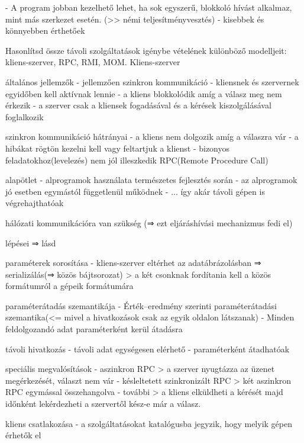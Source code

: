 \documentclass[12pt]{article}
\begin{document}
\begin{description}
        - A program jobban kezelhető lehet, ha sok egyszerű, blokkoló hívást alkalmaz, mint más szerkezet esetén. (>> némi teljesítményvesztés)
        - kisebbek és könnyebben érthetőek 
    \item  Hasonlítsd össze távoli szolgáltatások igénybe vételének különböző modelljeit: kliens-szerver, RPC, RMI, MOM.
        Kliens-szerver
    \item általános jellemzők
        - jellemzően szinkron kommunikáció
        - kliensnek és szervernek egyidőben kell aktívnak lennie
        - a kliens blokkolódik amíg a válasz meg nem érkezik
        - a szerver csak a kliensek fogadásával és a kérések kiszolgálásával foglalkozik
    \item szinkron kommunikáció hátrányai
        - a kliens nem dolgozik amíg a válaszra vár
        - a hibákat rögtön kezelni kell vagy feltartjuk a klienst
        - bizonyos feladatokhoz(levelezés) nem jól illeszkedik
        RPC(Remote Procedure Call)
    \item alapötlet
        - alprogramok használata természetes fejlesztés során
        - az alprogramok jó esetben egymástól függetlenül működnek
        - ... így akár távoli gépen is végrehajthatóak
    \item hálózati kommunikációra van szükség (⇒ ezt eljáráshívási mechanizmus fedi el)
    \item lépései ⇒ lásd 
    \item paraméterek sorosítása
        - kliens-szerver eltérhet az adatábrázolásban ⇒ serializálás(⇒ közös bájtsorozat)
        > a két csonknak fordítania kell a közös formátumról a gépeik formátumára
    \item paraméterátadás szemantikája
        - Érték–eredmény szerinti paraméterátadási szemantika(<=  mivel a hivatkozások csak az egyik oldalon látszanak)
        - Minden feldolgozandó adat paraméterként kerül átadásra
    \item távoli hivatkozás
        - távoli adat egységesen elérhető
        - paraméterként átadhatóak
    \item speciális megvalósítások
        - aszinkron RPC
        > a szerver nyugtázza az üzenet megérkezését, választ nem vár
        - késleltetett szinkronizált RPC
        > két aszinkron RPC egymással összehangolva
        - további
        > a kliens elküldheti a kérését majd időnként lekérdezheti a szervertől kész-e már a válasz.
    \item kliens csatlakozása
        - a szolgáltatásokat katalógusba jegyzik, hogy melyik gépen érhetők el

\end{description}
\end{document}
